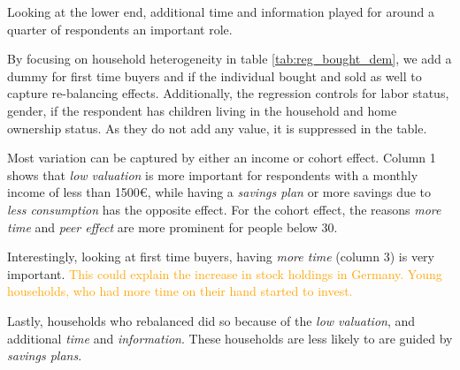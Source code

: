 \documentclass[ProjectABM]{subfiles}
\begin{document}
Looking at the lower end, additional time and information played for around a quarter of respondents an important role. %



By focusing on household heterogeneity in table \ref{tab:reg_bought_dem}, we add a dummy for first time buyers and if the individual bought and sold as well to capture re-balancing effects. Additionally, the regression controls for labor status, gender, if the respondent has children living in the household and home ownership status. As they do not add any value, it is suppressed in the table.

Most variation can be captured by either an income or cohort effect. Column 1 shows that \textit{low valuation} is more important for respondents with a monthly income of less than 1500\euro, while having a \textit{savings plan} or more savings due to \textit{less consumption} has the opposite effect. For the cohort effect, the reasons \textit{more time} and \textit{peer effect} are more prominent for people below 30.

Interestingly, looking at first time buyers, having \textit{more time} (column 3) is very important. \textcolor{orange}{This could explain the increase in stock holdings in Germany. Young households, who had more time on their hand started to invest.}

Lastly, households who rebalanced did so because of the \textit{low valuation}, and additional \textit{time} and \textit{information}. These households are less likely to are guided by \textit{savings plans}.

\end{document}
